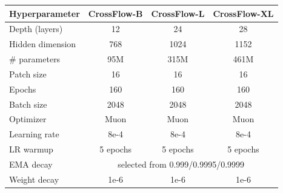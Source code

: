 \begin{center}
\vspace{0.5em}
\small
\begin{tabular}{l c c c}
\toprule
\textbf{Hyperparameter} & \textbf{CrossFlow-B} & \textbf{CrossFlow-L}  & \textbf{CrossFlow-XL} \\
\midrule
Depth (layers) & 12 & 24 & 28\\
Hidden dimension & 768 & 1024 & 1152 \\
\# parameters & 95M & 315M & 461M\\
Patch size & 16 & 16  & 16 \\
\midrule
Epochs & 160 & 160 & 160 \\
Batch size & 2048 & 2048 & 2048 \\
Optimizer & Muon & Muon & Muon \\
Learning rate & 8e-4 & 8e-4 & 8e-4 \\
LR warmup & 5 epochs & 5 epochs & 5 epochs \\
EMA decay & \multicolumn{3}{c}{selected from 0.999/0.9995/0.9999} \\
Weight decay & 1e-6 & 1e-6 & 1e-6 \\
\bottomrule
\end{tabular}
\label{tab:hyperparams}
\end{center}
